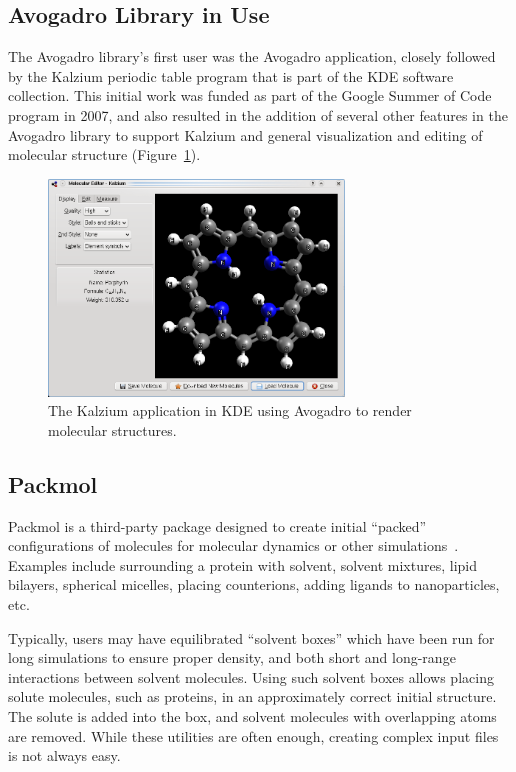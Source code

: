 \documentclass[10pt]{bmc_article}
\newenvironment{bmcformat}{\begin{raggedright}
\baselineskip20pt\sloppy\setboolean{publ}{false}}{\end{raggedright}
\baselineskip20pt\sloppy}
\begin{document}
\begin{bmcformat}
\section{Avogadro Library in Use}

The Avogadro library's first user was the Avogadro application, closely
followed by the Kalzium periodic table program that is part of the KDE software
collection. This initial work was funded as part of the Google Summer of Code
program in 2007, and also resulted in the addition of several other features in
the Avogadro library to support Kalzium and general visualization and editing
of molecular structure (Figure~\ref{f:kalzium}).

\begin{figure}
  \begin{center}
    \includegraphics[width=0.7\textwidth]{images/kalzium-porph}
  \end{center}
  \caption{The Kalzium application in KDE using Avogadro to render molecular structures.}
 \label{f:kalzium}
\end{figure}

\subsection{Packmol}

Packmol is a third-party package designed to create initial
``packed'' configurations of molecules for molecular dynamics or other
simulations~\cite{packmol,packmol-packing}. Examples include
surrounding a protein with solvent, solvent mixtures, lipid bilayers,
spherical micelles, placing counterions, adding ligands to
nanoparticles, etc.

Typically, users may have equilibrated ``solvent boxes'' which have
been run for long simulations to ensure proper density, and both short
and long-range interactions between solvent molecules. Using such
solvent boxes allows placing solute molecules, such as proteins, in an
approximately correct initial structure. The solute is added into the
box, and solvent molecules with overlapping atoms are removed. While
these utilities are often enough, creating complex input files is not
always easy.


\end{bmcformat}
\end{document}
